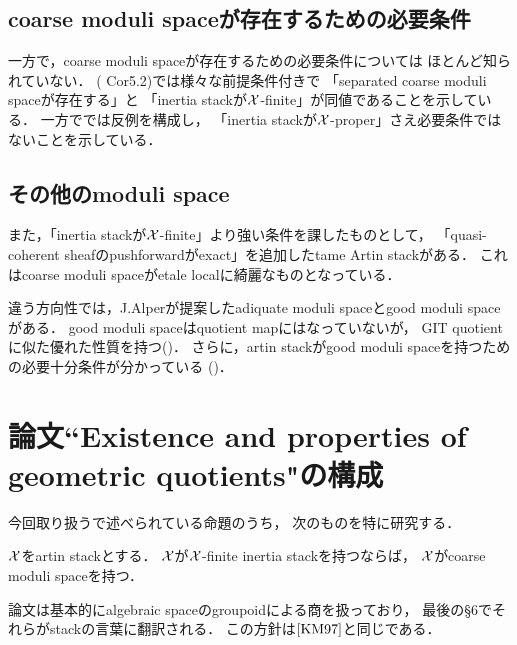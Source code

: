 \documentclass[a4paper, dvipdfmx]{jsarticle}
\begin{document}
    \subsection{coarse moduli spaceが存在するための必要条件}
    一方で，coarse moduli spaceが存在するための必要条件については
    ほとんど知られていない．
    (\cite{Con05} Cor5.2)では様々な前提条件付きで
    「separated coarse moduli spaceが存在する」と
    「inertia stackが$\mathcal{X}$-finite」が同値であることを示している．
    一方で\cite{Rydh13}では反例を構成し，
    「inertia stackが$\mathcal{X}$-proper」さえ必要条件ではないことを示している．

    \subsection{その他のmoduli space}
    また，「inertia stackが$\mathcal{X}$-finite」より強い条件を課したものとして，
    「quasi-coherent sheafのpushforwardがexact」を追加したtame Artin stackがある．
    これはcoarse moduli spaceがetale localに綺麗なものとなっている．

    違う方向性では，J.Alperが提案したadiquate moduli spaceとgood moduli spaceがある．
    good moduli spaceはquotient mapにはなっていないが，
    GIT quotientに似た優れた性質を持つ(\cite{Alp13})．
    さらに，artin stackがgood moduli spaceを持つための必要十分条件が分かっている
    (\cite{AHLH18})．

\section{論文``Existence and properties of geometric quotients"の構成}
    今回取り扱う\cite{Rydh13}で述べられている命題のうち，
    次のものを特に研究する．
    \begin{Thm}
        $\mathcal{X}$をartin stackとする．
        $\mathcal{X}$が$\mathcal{X}$-finite inertia stackを持つならば，
        $\mathcal{X}$がcoarse moduli spaceを持つ．
    \end{Thm}
    論文は基本的にalgebraic spaceのgroupoidによる商を扱っており，
    最後の\S 6でそれらがstackの言葉に翻訳される．
    この方針は$\cite{KM97}$と同じである．
\end{document}
